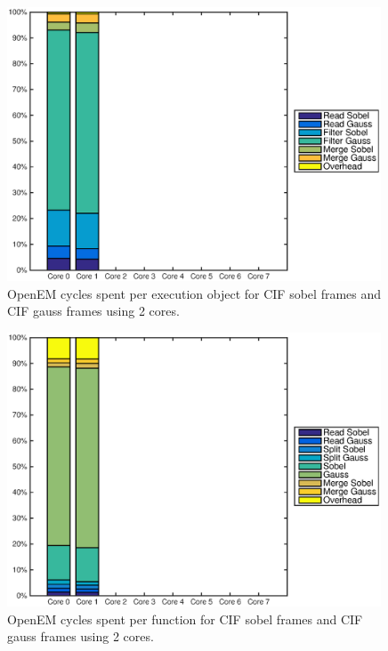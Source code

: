 \begin{figure}[h!]
    \begin{center}
        \includegraphics[width=0.99\textwidth]{images/openem_cifcif_2cores_eo.eps}
        \caption{OpenEM cycles spent per execution object for CIF sobel frames and CIF gauss frames using 2 cores.}
        \label{fig:oem2coreeo}
    \end{center}
\end{figure}

\begin{figure}[h!]
    \begin{center}
        \includegraphics[width=0.99\textwidth]{images/openem_cifcif_2cores_func.eps}
        \caption{OpenEM cycles spent per function for CIF sobel frames and CIF gauss frames using 2 cores.}
        \label{fig:oem2corefunc}
    \end{center}
\end{figure}


